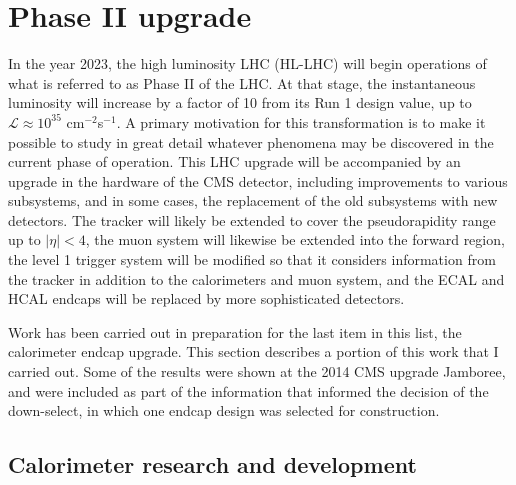 \section{Phase II upgrade}
In the year 2023, the high luminosity LHC (HL-LHC) will begin operations of what is referred to as Phase II of the LHC. At that stage, the instantaneous luminosity will increase by a factor of 10 from its Run 1 design value, up to $\mathcal{L}\approx10^{35}$ cm$^{-2}$s$^{-1}$. A primary motivation for this transformation is to make it possible to study in great detail whatever phenomena may be discovered in the current phase of operation. This LHC upgrade will be accompanied by an upgrade in the hardware of the CMS detector, including improvements to various subsystems, and in some cases, the replacement of the old subsystems with new detectors. The tracker will likely be extended to cover the pseudorapidity range up to $|\eta|<4$, the muon system will likewise be extended into the forward region, the level 1 trigger system will be modified so that it considers information from the tracker in addition to the calorimeters and muon system, and the ECAL and HCAL endcaps will be replaced by more sophisticated detectors. 

Work has been carried out in preparation for the last item in this list, the calorimeter endcap upgrade. This section describes a portion of this work that I carried out. Some of the results were shown at the 2014 CMS upgrade Jamboree, and were included as part of the information that informed the decision of the down-select, in which one endcap design was selected for construction. 

\subsection{Calorimeter research and development}

